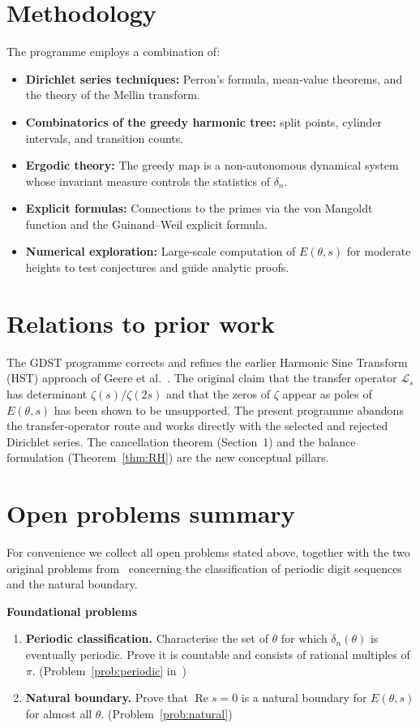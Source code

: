 \documentclass[11pt,a4paper]{article}
\theoremstyle{definition}
\theoremstyle{remark}
\begin{document}
\section{Methodology}
The programme employs a combination of:
\begin{itemize}
\item \textbf{Dirichlet series techniques:} Perron's formula, mean‑value theorems, and the theory of the Mellin transform.
\item \textbf{Combinatorics of the greedy harmonic tree:} split points, cylinder intervals, and transition counts.
\item \textbf{Ergodic theory:} The greedy map is a non‑autonomous dynamical system whose invariant measure controls the statistics of \(\delta_n\).
\item \textbf{Explicit formulas:} Connections to the primes via the von Mangoldt function and the Guinand–Weil explicit formula.
\item \textbf{Numerical exploration:} Large‑scale computation of \(E(\theta,s)\) for moderate heights to test conjectures and guide analytic proofs.
\end{itemize}

\section{Relations to prior work}
The GDST programme corrects and refines the earlier Harmonic Sine Transform (HST) approach of Geere et al.~\cite{HSTprogramme}.
The original claim that the transfer operator \(\mathcal{L}_s\) has determinant \(\zeta(s)/\zeta(2s)\) and that the zeros of \(\zeta\) appear as poles of \(E(\theta,s)\) has been shown to be unsupported.
The present programme abandons the transfer‑operator route and works directly with the selected and rejected Dirichlet series.
The cancellation theorem (Section~1) and the balance formulation (Theorem~\ref{thm:RH}) are the new conceptual pillars.

\section{Open problems summary}
For convenience we collect all open problems stated above, together with the two original problems from~\cite{GDSTfound} concerning the classification of periodic digit sequences and the natural boundary.

\vspace{4pt}
\noindent\textbf{Foundational problems}
\begin{enumerate}[label=\textbf{F\arabic*},leftmargin=*]
\item \textbf{Periodic classification.} Characterise the set of \(\theta\) for which \(\delta_n(\theta)\) is eventually periodic. Prove it is countable and consists of rational multiples of \(\pi\). \hfill (Problem~\ref{prob:periodic} in~\cite{GDSTfound})
\item \textbf{Natural boundary.} Prove that \(\operatorname{Re}s=0\) is a natural boundary for \(E(\theta,s)\) for almost all \(\theta\). \hfill (Problem~\ref{prob:natural})
\end{enumerate}
\end{document}
